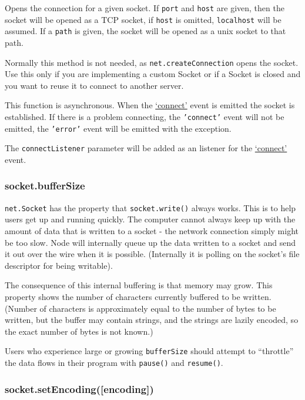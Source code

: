Opens the connection for a given socket. If \texttt{port} and
\texttt{host} are given, then the socket will be opened as a TCP socket,
if \texttt{host} is omitted, \texttt{localhost} will be assumed. If a
\texttt{path} is given, the socket will be opened as a unix socket to
that path.

Normally this method is not needed, as \texttt{net.createConnection}
opens the socket. Use this only if you are implementing a custom Socket
or if a Socket is closed and you want to reuse it to connect to another
server.

This function is asynchronous. When the
\hyperref[net_event_connect]{`connect'} event is emitted the socket is
established. If there is a problem connecting, the \texttt{'connect'}
event will not be emitted, the \texttt{'error'} event will be emitted
with the exception.

The \texttt{connectListener} parameter will be added as an listener for
the \hyperref[net_event_connect]{`connect'} event.

\subsubsection{socket.bufferSize}

\texttt{net.Socket} has the property that \texttt{socket.write()} always
works. This is to help users get up and running quickly. The computer
cannot always keep up with the amount of data that is written to a
socket - the network connection simply might be too slow. Node will
internally queue up the data written to a socket and send it out over
the wire when it is possible. (Internally it is polling on the socket's
file descriptor for being writable).

The consequence of this internal buffering is that memory may grow. This
property shows the number of characters currently buffered to be
written. (Number of characters is approximately equal to the number of
bytes to be written, but the buffer may contain strings, and the strings
are lazily encoded, so the exact number of bytes is not known.)

Users who experience large or growing \texttt{bufferSize} should attempt
to ``throttle'' the data flows in their program with \texttt{pause()}
and \texttt{resume()}.

\subsubsection{socket.setEncoding({[}encoding{]})}

